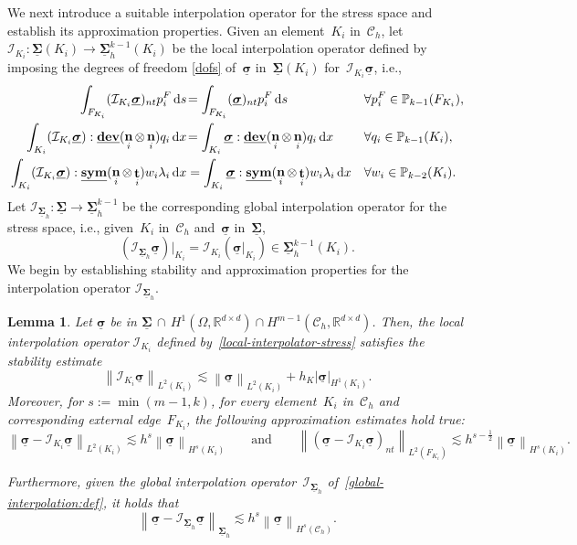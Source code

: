 \documentclass[a4paper,twoside,10pt]{article}
\theoremstyle{plain}
\newtheorem{lemma}[theorem]{Lemma}
\theoremstyle{remark}
\theoremstyle{definition}
\numberwithin{equation}{section}
\numberwithin{figure}{section}
\newcommand{\Norm}[1]{{\left\|{#1} \right\|}}
\newcommand{\SemiNorm}[1]{{\left|{#1} \right|}}
\newcommand{\Pbbkmo}{\mathbb{P}_{k-1}}
\newcommand{\Pbbkmt}{\mathbb{P}_{k-2}}
\newcommand{\Ccalh}{\mathcal{C}_h}
\newcommand{\Rbbdd}{\mathbb{R}^{d\times d}}
\newcommand{\K}{K}
\newcommand{\F}{F}
\newcommand{\Sigmah}{\underline{\boldsymbol{\Sigma}}_h}
\newcommand{\Sigmahkmo}{\Sigmah^{k-1}}
\newcommand{\sigmabf}{\underline{\boldsymbol{\sigma}}}
\DeclareMathOperator{\dev}{\underline{\mathbf{dev}}}
\newcommand{\normtang}{{nt}}
\newcommand{\sym}{\underline{\bf{sym}}}
\DeclareMathOperator{\norm}{\bf{n}}
\DeclareMathOperator{\tang}{\bf{t}}
\newcommand{\Ltwo}{L^2}
\newcommand{\dx}{\, \mathrm{d}x}
\newcommand{\ds}{\, \mathrm{d}s}
\newcommand{\lambdai}{\lambda_i}
\newcommand{\Ki}{{\K_i}}
\newcommand{\Fi}{{\F_{\Ki}}}
\newcommand{\normi}{\norm_i}
\newcommand{\tangi}{\tang_i}
\newcommand{\hK}{h_\K}
\newcommand{\IcalSigmahkmo}{\mathcal{I}_{\Sigmah}}
\newcommand{\IcalKi}{\mathcal{I}_{\Ki}}
\newcommand{\Sigmabf}{\underline{\boldsymbol{\Sigma}}}
\newcommand{\piF}{p_{i}^F}
\newcommand{\qi}{q_{i}}
\newcommand{\wi}{w_i}
\begin{document}
We next introduce a suitable interpolation operator
for the stress space and establish its approximation properties.
Given an element~$\Ki$ in~$\Ccalh$,
let $\IcalKi: \Sigmabf(\Ki)\to\Sigmahkmo(\Ki)$
be the local interpolation operator
defined by imposing the degrees of freedom \eqref{dofs}
of~$\sigmabf$ in~$\Sigmabf(\Ki)$ for~$\IcalKi \sigmabf$, i.e.,
\begin{subequations} \label{local-interpolator-stress}
    \begin{align} 
        \int_{\Fi} (\IcalKi\sigmabf)_{\normtang} \piF \ds
        &\!= \int_{\Fi} (\sigmabf)_{\normtang} \piF \ds 
            &&\forall\piF \in \Pbbkmo(\Fi), \label{interpolation:edge} \\ 
        \int_{\Ki} (\IcalKi\sigmabf) : \dev(\normi\otimes\normi) \qi \dx
        &\!=\int_{\Ki} \sigmabf : \dev(\normi\otimes\normi) \qi \dx  
            &&\forall\qi \in \Pbbkmo(\Ki), \label{interpolation:bulk-kmo} \\
        \int_{\Ki} (\IcalKi\sigmabf) : \sym(\normi\otimes\tangi) \wi \lambdai \dx
        &=\int_{\Ki} \sigmabf : \sym(\normi\otimes\tangi) \wi \lambdai \dx
            &&\forall\wi \in \Pbbkmt(\Ki) \label{interpolation:bulk-kmt-lambda}.
\end{align}
\end{subequations}
Let
$\IcalSigmahkmo : \Sigmabf \to \Sigmahkmo$
be the corresponding global interpolation operator for the stress space, i.e.,
given~$\Ki$ in~$\Ccalh$ and~$\sigmabf$ in~$\Sigmabf$,
\begin{equation} \label{global-interpolation:def}
    (\IcalSigmahkmo\sigmabf)|_{\Ki} = \IcalKi(\sigmabf|_{\Ki}) \in \Sigmahkmo(\Ki).
\end{equation}
We begin by establishing stability and approximation properties
for the interpolation operator $\IcalSigmahkmo$.
\begin{lemma}
Let $\sigmabf$ be in $\Sigmabf\,\cap\,H^1(\Omega,\Rbbdd) \cap H^{m-1}(\Ccalh,\Rbbdd)$.
Then,
the local interpolation operator $\IcalKi$ defined by~\eqref{local-interpolator-stress}
satisfies the stability estimate
\begin{equation*}
\Norm{\IcalKi\sigmabf}_{\Ltwo(\Ki)}
\lesssim \Norm{\sigmabf}_{\Ltwo(\Ki)} + \hK\SemiNorm{\sigmabf}_{H^1(\Ki)}.
\end{equation*}
Moreover,
for $s:= \min(m-1,k)$,
for every element~$\Ki$ in~$\Ccalh$
and corresponding external edge~$\Fi$,
the following approximation estimates hold true:
\begin{equation} \label{local-approximation:sigma}
\Norm{\sigmabf-\IcalKi\sigmabf}_{\Ltwo(\Ki)}
\lesssim
h^s\Norm{\sigmabf}_{H^s(\Ki)}
\qquad\text{and}\qquad
\Norm{(\sigmabf - \IcalKi\sigmabf)_{\normtang}}_{\Ltwo(\Fi)}
\lesssim h^{s-\frac12}\Norm{\sigmabf}_{H^s(\Ki)}.
\end{equation}

Furthermore,
given the global interpolation operator~$\IcalSigmahkmo$ of~\eqref{global-interpolation:def},
it holds that
\begin{equation} \label{global-approximation:sigma}
\Norm{\sigmabf-\IcalSigmahkmo\sigmabf}_{\Sigmah}
\lesssim
h^s\Norm{\sigmabf}_{H^s(\Ccalh)}.
\end{equation}
\end{lemma}
\end{document}
